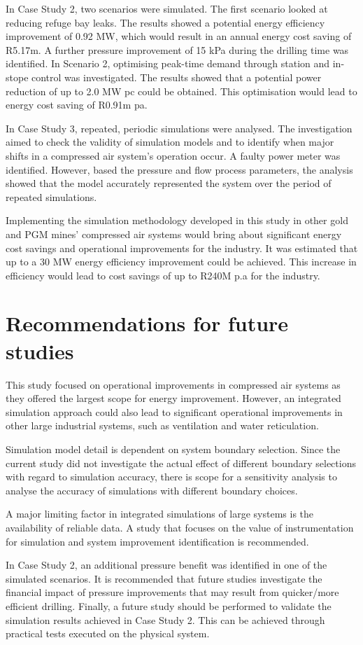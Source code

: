 	 \par
	 In Case Study 2, two scenarios were simulated. The first scenario looked at reducing refuge bay leaks. The results showed a potential energy efficiency improvement of 0.92 MW, which would result in an annual energy cost saving of R5.17m. A further pressure improvement of 15 kPa during the drilling time was identified. In Scenario 2, optimising peak-time demand through station and in-stope control was investigated. The results showed that a potential power reduction of up to 2.0 MW \gls{pc} could be obtained. This optimisation would lead to energy cost saving of R0.91m \gls{pa}.
	 \par 
	 In Case Study 3, repeated, periodic simulations were analysed. The investigation aimed to check the validity of simulation models and to identify when major shifts in a compressed air system’s operation occur. A faulty power meter was identified. However, based the pressure and flow process parameters, the analysis showed that the model accurately represented the system over the period of repeated simulations.
	 \par
	 Implementing the simulation methodology developed in this study in other gold and PGM mines' compressed air systems would  bring about significant energy cost savings and operational improvements for the industry. It was estimated that up to a 30 MW energy efficiency improvement could be achieved. This increase in efficiency would lead to cost savings of up to R240M p.a for the industry. 
	 \section{Recommendations for future studies}
	 This study focused on operational improvements in compressed air systems as they offered the largest scope for energy improvement. However, an integrated simulation approach could also lead to significant operational improvements in other large industrial systems, such as ventilation and water reticulation.
	 \par
	 Simulation model detail is dependent on system boundary selection. Since the current study did not investigate the actual effect of different boundary selections with regard to simulation accuracy, there is scope for a sensitivity analysis to analyse the accuracy of simulations with different boundary choices.
	 \par
	 A major limiting factor in integrated simulations of large systems is the availability of reliable data. A study that focuses on the value of instrumentation for simulation and system improvement identification is recommended.
	 \par 
	 In Case Study 2, an additional pressure benefit was identified in one of the simulated scenarios. It is recommended that future studies investigate the financial impact of pressure improvements that may result from quicker/more efficient drilling. Finally, a future study should be performed to validate the simulation results achieved in Case Study 2. This can be achieved through practical tests executed on the physical system.
